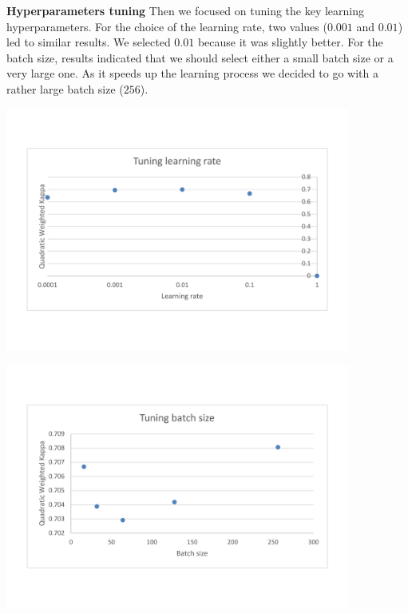 \documentclass[a4paper,12pt,english]{article}
\begin{document}
\textbf{Hyperparameters tuning} Then we focused on tuning the key learning hyperparameters. For the choice of the learning rate, two values ($0.001$ and $0.01$) led to similar results. We selected $0.01$ because it was slightly better. For the batch size, results indicated that we should select either a small batch size or a very large one. As it speeds up the learning process we decided to go with a rather large batch size ($256$).

\begin{center}
\vspace*{-1.5cm}
\includegraphics[width=0.85\textwidth]{fig/tune_lr.pdf}
\vspace*{-1.5cm}
\end{center}

\begin{center}
\vspace*{-1.5cm}
\includegraphics[width=0.85\textwidth]{fig/tune_bs.pdf}
\vspace*{-1.5cm}
\end{center}
\end{document}
